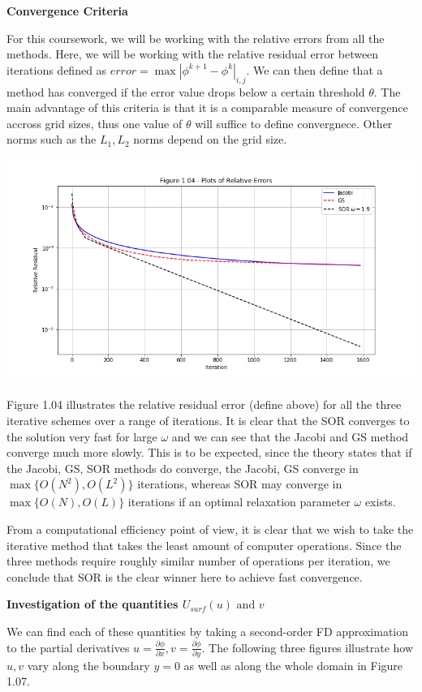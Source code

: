 \documentclass[12pt]{article}
\begin{document}
    \newpage
    \textbf{Convergence Criteria}

    For this coursework, we will be working with the relative errors from all the methods. Here, we will be working with the relative residual error between iterations defined as $error = \max|\phi^{k+1} - \phi^{k}|_{i, j}$. We can then define that a method has converged if the error value drops below a certain threshold $\theta$. The main advantage of this criteria is that it is a comparable measure of convergence accross grid sizes, thus one value of $\theta$ will suffice to define convergnece. Other norms such as the $L_1, L_2$ norms depend on the grid size.

    \includegraphics[width=\textwidth]{fig1.04}

    Figure 1.04 illustrates the relative residual error (define above) for all the three iterative schemes over a range of iterations. It is clear that the SOR converges to the solution very fast for large $\omega$ and we can see that the Jacobi and GS method converge much more slowly. This is to be expected, since the theory states that if the Jacobi, GS, SOR methods do converge, the Jacobi, GS converge in $\max\{O(N^2), O(L^2)\}$ iterations, whereas SOR may converge in $\max\{O(N), O(L)\}$ iterations if an optimal relaxation parameter $\omega$ exists.

    From a computational efficiency point of view, it is clear that we wish to take the iterative method that takes the least amount of computer operations. Since the three methods require roughly similar number of operations per iteration, we conclude that SOR is the clear winner here to achieve fast convergence.

    \newpage
    \textbf{Investigation of the quantities $U_{surf} (u) \text{ and } v$}

    We can find each of these quantities by taking a second-order FD approximation to the partial derivatives $u = \frac{\partial \phi}{\partial x}, v = \frac{\partial \phi}{\partial y}$. The following three figures illustrate how $u, v$  vary along the boundary $y=0$ as well as along the whole domain in Figure 1.07.
\end{document}
